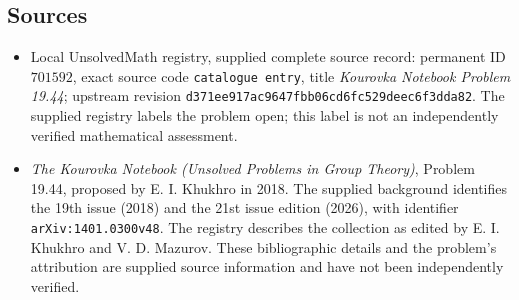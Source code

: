 \documentclass[11pt]{article}
\begin{document}
\subsection{Sources}
\begin{itemize}
\item Local UnsolvedMath registry, supplied complete source record: permanent ID \(701592\), exact source code \texttt{catalogue entry}, title \emph{Kourovka Notebook Problem 19.44}; upstream revision \texttt{d371ee917ac9647fbb06cd6fc529deec6f3dda82}. The supplied registry labels the problem open; this label is not an independently verified mathematical assessment.
\item \emph{The Kourovka Notebook (Unsolved Problems in Group Theory)}, Problem 19.44, proposed by E. I. Khukhro in 2018. The supplied background identifies the 19th issue (2018) and the 21st issue edition (2026), with identifier \texttt{arXiv:1401.0300v48}. The registry describes the collection as edited by E. I. Khukhro and V. D. Mazurov. These bibliographic details and the problem's attribution are supplied source information and have not been independently verified.
\end{itemize}
\end{document}
